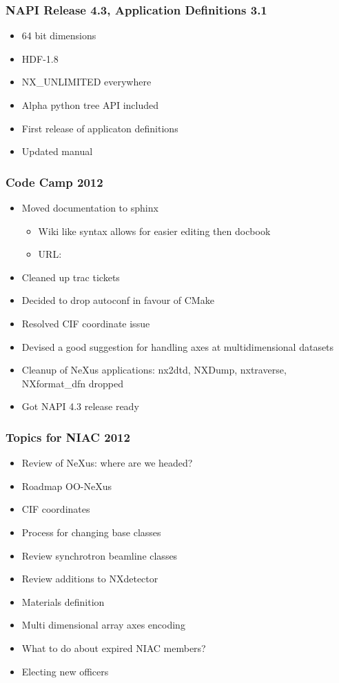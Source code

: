 \documentclass{beamer}
\begin{document}
\begin{frame}
\frametitle{NAPI Release 4.3, Application Definitions 3.1}
\begin{itemize}
\item 64 bit dimensions
\item HDF-1.8
\item NX\_UNLIMITED everywhere
\item Alpha python tree API included
\item First release of applicaton definitions
\item Updated manual
\end{itemize}
\end{frame}


\begin{frame}
\frametitle{Code Camp 2012}
\begin{itemize}
\item Moved documentation to sphinx
\begin{itemize}
\item Wiki like syntax allows for easier editing then docbook
\item URL: 
\end{itemize}
\item Cleaned up trac tickets
\item Decided to drop autoconf in favour of CMake
\item Resolved CIF coordinate issue
\item Devised a good suggestion for handling axes at multidimensional 
  datasets
\item Cleanup of NeXus applications: nx2dtd, NXDump, nxtraverse, NXformat\_dfn dropped
\item Got NAPI 4.3 release ready
\end{itemize}
\end{frame}


\begin{frame}
\frametitle{Topics for NIAC 2012}
\begin{itemize}
\item Review of NeXus: where are we headed?
\item Roadmap OO-NeXus
\item CIF coordinates
\item Process for changing base classes
\item Review synchrotron beamline classes
\item Review additions to NXdetector
\item Materials definition
\item Multi dimensional array axes encoding
\item What to do about expired NIAC members?
\item Electing new officers
\end{itemize}
\end{frame}
\end{document}
